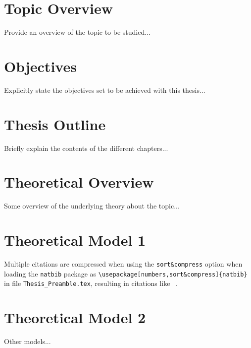 

\section{Topic Overview}
\label{section:overview}

Provide an overview of the topic to be studied...


\section{Objectives}
\label{section:objectives}

Explicitly state the objectives set to be achieved with this thesis...


\section{Thesis Outline}
\label{section:outline}

Briefly explain the contents of the different chapters...



\section{Theoretical Overview}
\label{section:teoroverview}


Some overview of the underlying theory about the topic...


\section{Theoretical Model 1}
\label{section:theory1}



Multiple citations are compressed when using the {\tt sort\&compress} option when loading the {\tt natbib} package as {\tt \textbackslash usepackage[numbers,sort\&compress]\{natbib\}} in file {\tt Thesis\_Preamble.tex}, resulting in citations like ~\citep{Hull,Wilmott}.


\section{Theoretical Model 2}
\label{section:theory2}

Other models...





